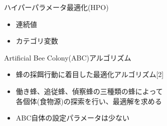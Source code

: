 \documentclass[12pt, cjk, dvipdfmx]{beamer}
\begin{document}
\begin{frame}
\begin{columns}[t]
\begin{column}{0.490\linewidth}
\begin{mybox}{ハイパーパラメータ最適化(HPO)}
\begin{itemize}
\begin{itemize}
                  \item 連続値
                  \item カテゴリ変数
                \end{itemize}
              \end{itemize}
            \end{mybox}
            \begin{mybox}{Artificial Bee Colony(ABC)アルゴリズム}
              \begin{itemize}
                \item 蜂の採餌行動に着目した最適化アルゴリズム[2]
                \item 働き蜂、追従蜂、偵察蜂の三種類の蜂によって\\各個体(食物源)の探索を行い、最適解を求める
                \item ABC自体の設定パラメータは少ない
              \end{itemize}
          \end{mybox}
        \end{column}
        \begin{column}{0.490\linewidth}
          

\end{column}
\end{columns}
\end{frame}
\end{document}
